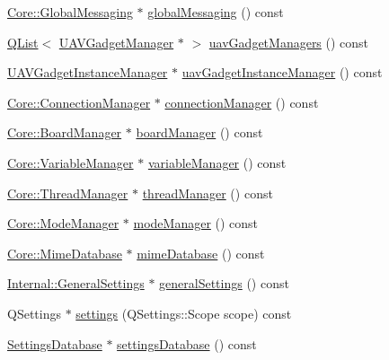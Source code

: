 \begin{DoxyCompactItemize}
\hyperlink{class_core_1_1_global_messaging}{Core\-::\-Global\-Messaging} $\ast$ \hyperlink{group___core_plugin_ga36cb88f703fd8e9cc4662216ba0c9967}{global\-Messaging} () const 
\item 
\hyperlink{class_q_list}{Q\-List}$<$ \hyperlink{class_core_1_1_u_a_v_gadget_manager}{U\-A\-V\-Gadget\-Manager} $\ast$ $>$ \hyperlink{group___core_plugin_ga709d0285d98b057ef104765fb89e18f9}{uav\-Gadget\-Managers} () const 
\item 
\hyperlink{class_core_1_1_u_a_v_gadget_instance_manager}{U\-A\-V\-Gadget\-Instance\-Manager} $\ast$ \hyperlink{group___core_plugin_ga2edd476d12d600aebca7dbced9b8d282}{uav\-Gadget\-Instance\-Manager} () const 
\item 
\hyperlink{class_core_1_1_connection_manager}{Core\-::\-Connection\-Manager} $\ast$ \hyperlink{group___core_plugin_ga3942909620084af15c1e375d738c9b10}{connection\-Manager} () const 
\item 
\hyperlink{class_core_1_1_board_manager}{Core\-::\-Board\-Manager} $\ast$ \hyperlink{group___core_plugin_ga7325ec21ffd857f0bd272a845f80e0c9}{board\-Manager} () const 
\item 
\hyperlink{class_core_1_1_variable_manager}{Core\-::\-Variable\-Manager} $\ast$ \hyperlink{group___core_plugin_ga031742760ce2003b77a2b2abdd7c34f6}{variable\-Manager} () const 
\item 
\hyperlink{class_core_1_1_thread_manager}{Core\-::\-Thread\-Manager} $\ast$ \hyperlink{group___core_plugin_ga9d593b4ed45b8e7fc6652a56829d3777}{thread\-Manager} () const 
\item 
\hyperlink{class_core_1_1_mode_manager}{Core\-::\-Mode\-Manager} $\ast$ \hyperlink{group___core_plugin_gac45c5a592157e5fa6521f7dfa811edae}{mode\-Manager} () const 
\item 
\hyperlink{class_core_1_1_mime_database}{Core\-::\-Mime\-Database} $\ast$ \hyperlink{group___core_plugin_gac877661e05b7a0bb1f6a56446ddd805c}{mime\-Database} () const 
\item 
\hyperlink{class_core_1_1_internal_1_1_general_settings}{Internal\-::\-General\-Settings} $\ast$ \hyperlink{group___core_plugin_ga5426092301e2717f66c384e4a33fe5c6}{general\-Settings} () const 
\item 
Q\-Settings $\ast$ \hyperlink{group___core_plugin_ga14fadbb1735f8dddb54ae61aee869a40}{settings} (Q\-Settings\-::\-Scope scope) const 
\item 
\hyperlink{class_core_1_1_settings_database}{Settings\-Database} $\ast$ \hyperlink{group___core_plugin_ga4768189d93215bf06dac570535a03fdd}{settings\-Database} () const 

\end{DoxyCompactItemize}
